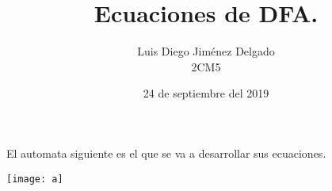 \documentclass[12pt]{article}
\title{Ecuaciones de DFA.}
\author{Luis Diego Jiménez Delgado\\ 2CM5}
\date{24 de septiembre del 2019}
\begin{document}
    \maketitle
    \newpage
        El automata siguiente es el que se va a desarrollar sus ecuaciones.
        \begin{center}
            \texttt{[image: a]}
        \end{center}
        
\end{document}
